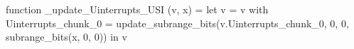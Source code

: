 function _update_Uinterrupts_USI (v, x) = let v = { v with Uinterrupts_chunk_0 = update_subrange_bits(v.Uinterrupts_chunk_0, 0, 0, subrange_bits(x, 0, 0)) } in
  v
